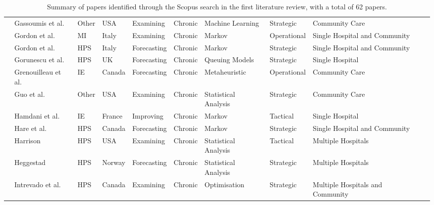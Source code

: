 \documentclass[thesis.tex]{subfiles}
\begin{document}
\begin{landscape}
\begin{table}[H]
{\begin{tabular}{@{}llllllllll@{}}
  \cite{Gassoumis} & Gassoumis et al. & Other & USA & Examining &Chronic& Machine Learning & Strategic  &Community Care\\ 
  \cite{Gordon1} & Gordon et al. & MI & Italy & Examining & Chronic & Markov &Operational & Single Hospital and Community\\
  \cite{Gordon2} & Gordon et al. & HPS & Italy & Forecasting & Chronic & Markov & Strategic& Single Hospital and Community \\
  \cite{Gorunescu} & Gorunescu et al. &HPS & UK &Forecasting & Chronic & Queuing Models & Strategic & Single Hospital \\
  \cite{Grenouilleau} & Grenouilleau et al. & IE & Canada &Forecasting& Chronic &Metaheuristic &Operational & Community Care \\
  \cite{Guo} & Guo et al. & Other & USA & Examining & Chronic& Statistical Analysis & Strategic & Community Care \\
  \cite{Hamdani} & Hamdani et al. & IE& France & Improving &Chronic & Markov & Tactical & Single Hospital \\
  \cite{Hare} & Hare et al. &HPS & Canada & Forecasting &Chronic & Markov & Strategic & Single Hospital and Community \\
 \cite{Harrison} & Harrison & HPS & USA & Examining & Chronic & Statistical Analysis & Tactical& Multiple Hospitals \\
 \cite{Heggestad} & Heggestad & HPS & Norway & Forecasting & Chronic & Statistical Analysis & Strategic & Multiple Hospitals \\
     \cite{Intrevado} & Intrevado et al. & HPS & Canada& Examining & Chronic & Optimisation & Strategic & Multiple Hospitals and Community \\

       \bottomrule
    \end{tabular}
    }   
    \label{app:tablr1}
    \caption{{Summary of papers identified through the Scopus search in the first literature review, with a total of 62 papers.}}
\end{table}


\end{landscape}
\end{document}

